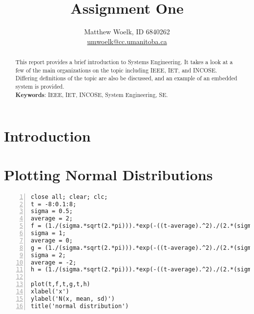 \documentclass[a4paper,12pt]{article}
\title{Assignment One}
\author{Matthew Woelk, ID 6840262\\ \href{mailto:umwoelk@cc.umanitoba.ca}{umwoelk@cc.umanitoba.ca}}
\begin{document}





\maketitle
\thispagestyle{empty}

\tableofcontents

\newpage



\begin{abstract} 
This report provides a brief introduction to Systems Engineering.  It takes a look at a few of the main organizations on the topic including IEEE, IET, and INCOSE.  Differing definitions of the topic are also be discussed, and an example of an embedded system is provided.\\

{\bf Keywords}: IEEE, IET, INCOSE, System Engineering, SE. 

\end{abstract}



\section*{Introduction}




\section{Plotting Normal Distributions}

\begin{lstlisting}[numbers=left,firstnumber=1,label=lst1]
close all; clear; clc;
t = -8:0.1:8;
sigma = 0.5;
average = 2;
f = (1./(sigma.*sqrt(2.*pi))).*exp(-((t-average).^2)./(2.*(sigma.^2)));
sigma = 1;
average = 0;
g = (1./(sigma.*sqrt(2.*pi))).*exp(-((t-average).^2)./(2.*(sigma.^2)));
sigma = 2;
average = -2;
h = (1./(sigma.*sqrt(2.*pi))).*exp(-((t-average).^2)./(2.*(sigma.^2)));

plot(t,f,t,g,t,h)
xlabel('x')
ylabel('N(x, mean, sd)')
title('normal distribution')
\end{lstlisting}
\end{document}
